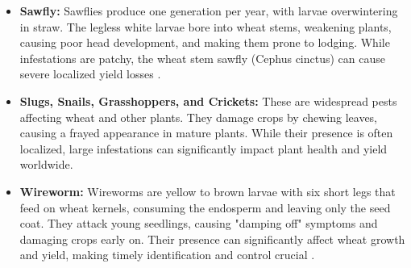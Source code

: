 \begin{itemize}
    \item \textbf{Sawfly:} Sawflies produce one generation per year, with larvae overwintering in straw. The legless white larvae bore into wheat stems, weakening plants, causing poor head development, and making them prone to lodging. While infestations are patchy, the wheat stem sawfly (Cephus cinctus) can cause severe localized yield losses \parencite{duveiller2012wheat}.

    \item \textbf{Slugs, Snails, Grasshoppers, and Crickets:} These are widespread pests affecting wheat and other plants. They damage crops by chewing leaves, causing a frayed appearance in mature plants. While their presence is often localized, large infestations can significantly impact plant health and yield worldwide.

    \item \textbf{Wireworm:} Wireworms are yellow to brown larvae with six short legs that feed on wheat kernels, consuming the endosperm and leaving only the seed coat. They attack young seedlings, causing "damping off" symptoms and damaging crops early on. Their presence can significantly affect wheat growth and yield, making timely identification and control crucial \parencite{farook2019insect}.
\end{itemize}

